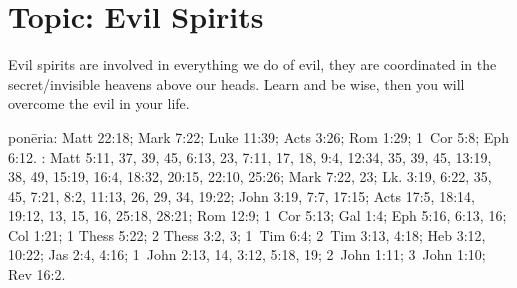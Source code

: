 \section{Topic: Evil Spirits}

Evil spirits are involved in everything we do of evil, they are coordinated in the secret/invisible heavens above our heads. Learn and be wise, then you will overcome the evil in your life. 

\gls{ponēria}: Matt 22:18; Mark 7:22; Luke 11:39; Acts 3:26; Rom 1:29; 1~Cor 5:8; Eph 6:12. : Matt 5:11, 37, 39, 45, 6:13, 23, 7:11, 17, 18, 9:4, 12:34, 35, 39, 45, 13:19, 38, 49, 15:19, 16:4, 18:32, 20:15, 22:10, 25:26; Mark 7:22, 23; Lk. 3:19, 6:22, 35, 45, 7:21, 8:2, 11:13, 26, 29, 34, 19:22; John 3:19, 7:7, 17:15; Acts 17:5, 18:14, 19:12, 13, 15, 16, 25:18, 28:21; Rom 12:9; 1~Cor 5:13; Gal 1:4; Eph 5:16, 6:13, 16; Col 1:21; 1 Thess 5:22; 2 Thess 3:2, 3; 1~Tim 6:4; 2~Tim 3:13, 4:18; Heb 3:12, 10:22; Jas 2:4, 4:16; 1~John 2:13, 14, 3:12, 5:18, 19; 2~John 1:11; 3~John 1:10; Rev 16:2.
